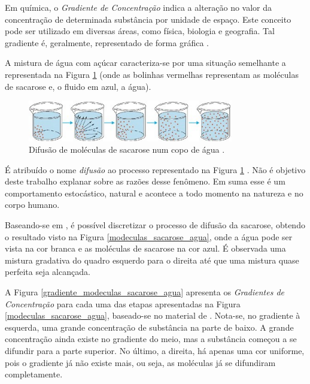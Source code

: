 Em química, o \emph{Gradiente de Concentração} indica a alteração no valor da concentração de determinada substância por unidade de espaço. Este conceito pode ser utilizado em diversas áreas, como física, biologia e geografia. Tal gradiente é, geralmente, representado de forma gráfica \cite{concentrationGradient}.

A mistura de água com açúcar caracteriza-se por uma situação semelhante a representada na Figura \ref{agua_acucar_copo} (onde as bolinhas vermelhas representam as moléculas de sacarose e, o fluido em azul, a água).

\begin{figure}[htp!]
\centering
\includegraphics[width=0.80\textwidth]{figuras/cap_2/secao_2/agua_acucar_copo.jpg}
\caption{Difusão de moléculas de sacarose num copo de água \cite{concentrationGradient}.}
\label{agua_acucar_copo}
\end{figure}

É atribuído o nome \emph{difusão} ao processo representado na Figura \ref{agua_acucar_copo} \cite{concentrationGradient}. Não é objetivo deste trabalho explanar sobre as razões desse fenômeno. Em suma esse é um comportamento estocástico, natural e acontece a todo momento na natureza e no corpo humano.

Baseando-se em \cite{concentrationGradient}, é possível discretizar o processo de difusão da sacarose, obtendo o resultado visto na Figura \ref{modeculas_sacarose_agua}, onde a água pode ser vista na cor branca e as moléculas de sacarose na cor azul. É observada uma mistura gradativa do quadro esquerdo para o direita até que uma mistura quase perfeita seja alcançada.

A Figura \ref{gradiente_modeculas_sacarose_agua} apresenta os \emph{Gradientes de Concentração} para cada uma das etapas apresentadas na Figura \ref{modeculas_sacarose_agua}, baseado-se no material de \cite{concentrationGradient}. Nota-se, no gradiente à esquerda, uma grande concentração de substância na parte de baixo. A grande concentração ainda existe no gradiente do meio, mas a substância começou a se difundir para a parte superior. No último, a direita, há apenas uma cor uniforme, pois o gradiente já não existe mais, ou seja, as moléculas já se difundiram completamente.

